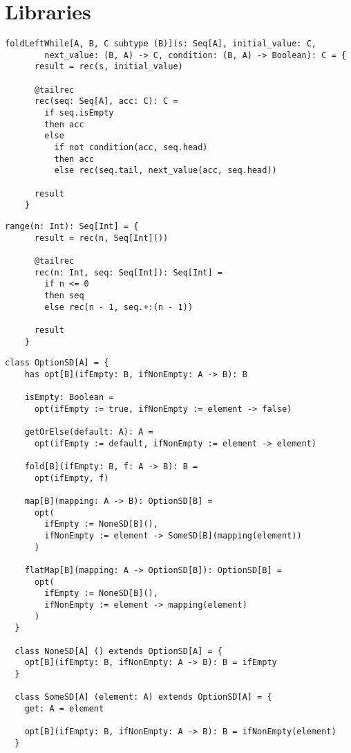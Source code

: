 \chapter{Libraries}

\begin{lstlisting}[label={lst:foldLeftWhile}]
    foldLeftWhile[A, B, C subtype (B)](s: Seq[A], initial_value: C,
        next_value: (B, A) -> C, condition: (B, A) -> Boolean): C = {
      result = rec(s, initial_value)

      @tailrec
      rec(seq: Seq[A], acc: C): C =
        if seq.isEmpty
        then acc
        else
          if not condition(acc, seq.head)
          then acc
          else rec(seq.tail, next_value(acc, seq.head))

      result
    }
\end{lstlisting}

\begin{lstlisting}[label={lst:range}]
    range(n: Int): Seq[Int] = {
      result = rec(n, Seq[Int]())

      @tailrec
      rec(n: Int, seq: Seq[Int]): Seq[Int] =
        if n <= 0
        then seq
        else rec(n - 1, seq.+:(n - 1))

      result
    }
\end{lstlisting}


\begin{lstlisting}[label={lst:option}]
  class OptionSD[A] = {
    has opt[B](ifEmpty: B, ifNonEmpty: A -> B): B

    isEmpty: Boolean =
      opt(ifEmpty := true, ifNonEmpty := element -> false)

    getOrElse(default: A): A =
      opt(ifEmpty := default, ifNonEmpty := element -> element)

    fold[B](ifEmpty: B, f: A -> B): B =
      opt(ifEmpty, f)

    map[B](mapping: A -> B): OptionSD[B] =
      opt(
        ifEmpty := NoneSD[B](),
        ifNonEmpty := element -> SomeSD[B](mapping(element))
      )

    flatMap[B](mapping: A -> OptionSD[B]): OptionSD[B] =
      opt(
        ifEmpty := NoneSD[B](),
        ifNonEmpty := element -> mapping(element)
      )
  }

  class NoneSD[A] () extends OptionSD[A] = {
    opt[B](ifEmpty: B, ifNonEmpty: A -> B): B = ifEmpty
  }

  class SomeSD[A] (element: A) extends OptionSD[A] = {
    get: A = element

    opt[B](ifEmpty: B, ifNonEmpty: A -> B): B = ifNonEmpty(element)
  }
\end{lstlisting}

